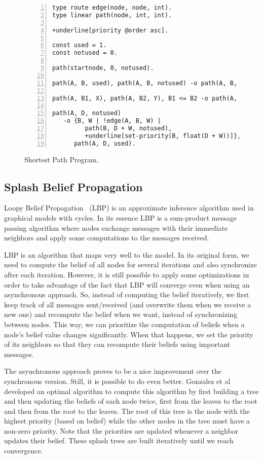 \begin{figure}[h!]
\small\begin{Verbatim}[numbers=left,commandchars=+\[\]]
type route edge(node, node, int).
type linear path(node, int, int).

+underline[priority @order asc].

const used = 1.
const notused = 0.

path(startnode, 0, notused).

path(A, B, used), path(A, B, notused) -o path(A, B, used).

path(A, B1, X), path(A, B2, Y), B1 <= B2 -o path(A, B1, X).

path(A, D, notused)
   -o {B, W | !edge(A, B, W) |
         path(B, D + W, notused),
         +underline[set-priority(B, float(D + W))]},
      path(A, D, used).
\end{Verbatim}
  \caption{Shortest Path Program.}
  \label{code:shortest_path_program}
\end{figure}
\normalsize

\subsection{Splash Belief Propagation}

Loopy Belief Propagation~\cite{Murphy99loopybelief} (LBP) is an approximate inference algorithm
used in graphical models with cycles. In its essence LBP is a sum-product message passing algorithm
where nodes exchange messages with their immediate neighbors and apply some computations to the messages
received.

LBP is an algorithm that maps very well to the \lang model. In its original form, we need to compute
the belief of all nodes for several iterations and also synchronize after each iteration.
However, it is still possible to apply
some optimizations in order to take advantage of the fact that LBP will converge even when using
an asynchronous approach. So, instead of computing the belief iteratively,
we first keep track of all messages sent/received (and overwrite them when we receive a new one)
and recompute the belief when we want, instead of synchronizing between nodes.
This way, we can prioritize the computation of beliefs when
a node's belief value changes significantly. When that happens, we set the priority of its
neighbors so that they can recompute their beliefs using important messages.

The asynchronous approach proves to be a nice improvement over the synchronous version. Still, it
is possible to do even better. Gonzalez et al~\cite{Gonzalez+al:aistats09paraml} developed an optimal
algorithm to compute this algorithm by first building a tree and then updating the beliefs of each node twice, first from the leaves to the root and then from the root to the leaves. The root of this tree
is the node with the highest priority (based on belief) while the other nodes in the tree
must have a non-zero priority. Note that the priorities are updated whenever a neighbor updates
their belief. These splash trees are built iteratively until we reach convergence.

